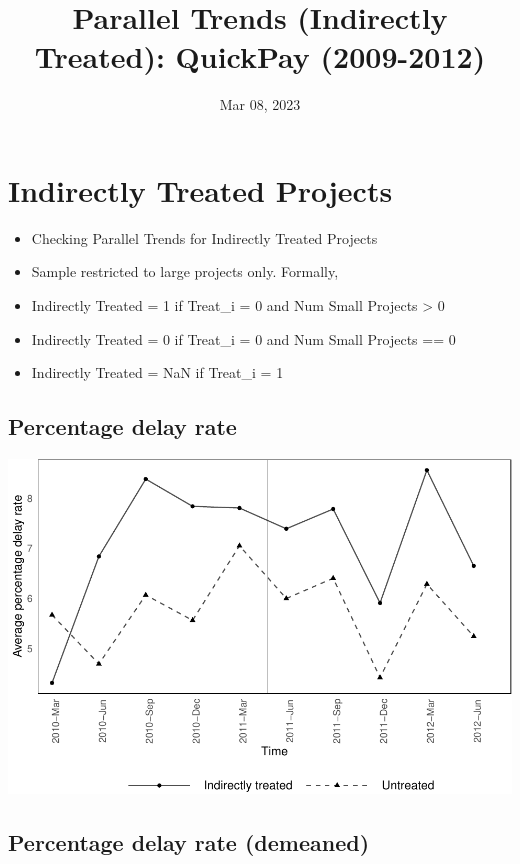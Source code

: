 \documentclass[
]{article}
\title{Parallel Trends (Indirectly Treated): QuickPay (2009-2012)}
\author{}
\date{\vspace{-2.5em}Mar 08, 2023}
\providecommand{\tightlist}{%
  \setlength{\itemsep}{0pt}\setlength{\parskip}{0pt}}
\begin{document}
\maketitle

\hypertarget{indirectly-treated-projects}{%
\section{Indirectly Treated
Projects}\label{indirectly-treated-projects}}

\begin{itemize}
\tightlist
\item
  Checking Parallel Trends for Indirectly Treated Projects
\item
  Sample restricted to large projects only. Formally,
\item
  Indirectly Treated = 1 if Treat\_i = 0 and Num Small Projects
  \textgreater{} 0
\item
  Indirectly Treated = 0 if Treat\_i = 0 and Num Small Projects == 0
\item
  Indirectly Treated = NaN if Treat\_i = 1
\end{itemize}

\hypertarget{percentage-delay-rate}{%
\subsection{Percentage delay rate}\label{percentage-delay-rate}}

\includegraphics{parallel_trends_indirect_treat_files/figure-latex/raw_percentage_delay_plot-1.pdf}

\hypertarget{percentage-delay-rate-demeaned}{%
\subsection{Percentage delay rate
(demeaned)}\label{percentage-delay-rate-demeaned}}
\end{document}
